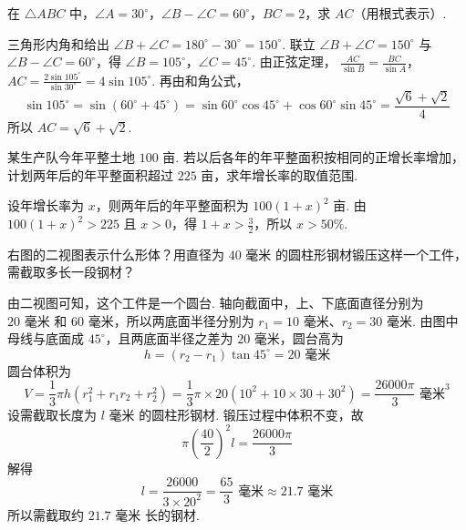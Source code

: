 \begin{problem}
在 \( \triangle ABC \) 中，\( \angle A=30^\circ \)，\( \angle B-\angle C=60^\circ \)，\( BC=2 \)，求 \(AC\)（用根式表示）.

\end{problem}

\begin{solution}
三角形内角和给出 \(\angle B+\angle C=180^\circ-30^\circ=150^\circ\). 联立
\(\angle B+\angle C=150^\circ\) 与 \(\angle B-\angle C=60^\circ\)，得
\(\angle B=105^\circ\)，\(\angle C=45^\circ\). 由正弦定理，
\(\frac{AC}{\sin B}=\frac{BC}{\sin A}\)，\(AC=\frac{2\sin105^\circ}{\sin30^\circ}=4\sin105^\circ\).
再由和角公式，
\[
\sin105^\circ=\sin\left(60^\circ+45^\circ\right)
 =\sin60^\circ\cos45^\circ+\cos60^\circ\sin45^\circ
 =\frac{\sqrt6+\sqrt2}{4}
\]
所以 \(AC=\sqrt6+\sqrt2\).
\end{solution}


\begin{problem}
某生产队今年平整土地 \(100\text{ 亩}\). 若以后各年的年平整面积按相同的正增长率增加，计划两年后的年平整面积超过 \(225\text{ 亩}\)，求年增长率的取值范围.
\end{problem}

\begin{solution}
设年增长率为 \(x\)，则两年后的年平整面积为 \(100(1+x)^2\text{ 亩}\). 由 \(100(1+x)^2>225\) 且 \(x>0\)，得 \(1+x>\frac32\)，所以 \(x>50\%\).
\end{solution}


\begin{problem}
右图的二视图表示什么形体？用直径为 \(40\text{ 毫米}\) 的圆柱形钢材锻压这样一个工件，需截取多长一段钢材？

\end{problem}

\begin{solution}
由二视图可知，这个工件是一个圆台. 轴向截面中，上、下底面直径分别为 \(20\text{ 毫米}\) 和 \(60\text{ 毫米}\)，所以两底面半径分别为
\(r_1=10\text{ 毫米}\)、\(r_2=30\text{ 毫米}\). 由图中母线与底面成 \(45^\circ\)，且两底面半径之差为 \(20\text{ 毫米}\)，圆台高为
\[
h=\left(r_2-r_1\right)\tan45^\circ=20\text{ 毫米}
\]
圆台体积为
\[
V=\frac13\pi h\left(r_1^2+r_1r_2+r_2^2\right)
 =\frac13\pi\times20\left(10^2+10\times30+30^2\right)
 =\frac{26000\pi}{3}\text{ 毫米}^3
\]
设需截取长度为 \(l\text{ 毫米}\) 的圆柱形钢材. 锻压过程中体积不变，故
\[
\pi\left(\frac{40}{2}\right)^2l=\frac{26000\pi}{3}
\]
解得
\[
l=\frac{26000}{3\times20^2}=\frac{65}{3}\text{ 毫米}\approx21.7\text{ 毫米}
\]
所以需截取约 \(21.7\text{ 毫米}\) 长的钢材.
\end{solution}


